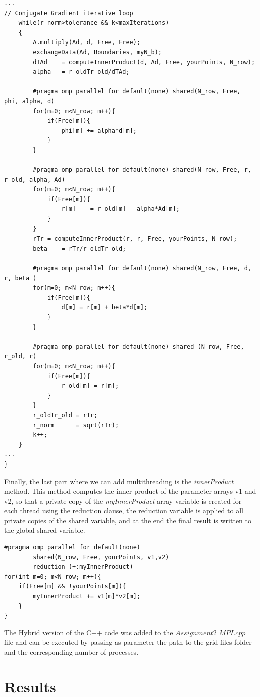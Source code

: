 \documentclass[12pt]{article}
\begin{document}
\begin{lstlisting}[style=MyC++Style]
...
// Conjugate Gradient iterative loop
    while(r_norm>tolerance && k<maxIterations)
    {
    	A.multiply(Ad, d, Free, Free);
		exchangeData(Ad, Boundaries, myN_b);
		dTAd	= computeInnerProduct(d, Ad, Free, yourPoints, N_row);
		alpha  	= r_oldTr_old/dTAd;
        
		#pragma omp parallel for default(none) shared(N_row, Free, phi, alpha, d)
		for(m=0; m<N_row; m++){
			if(Free[m]){
				phi[m] += alpha*d[m];
			}
		}
        
		#pragma omp parallel for default(none) shared(N_row, Free, r, r_old, alpha, Ad)
		for(m=0; m<N_row; m++){
			if(Free[m]){
				r[m]	= r_old[m] - alpha*Ad[m];
			}
		}
		rTr	= computeInnerProduct(r, r, Free, yourPoints, N_row);
		beta  	= rTr/r_oldTr_old;
        
		#pragma omp parallel for default(none) shared(N_row, Free, d, r, beta )
		for(m=0; m<N_row; m++){
			if(Free[m]){
				d[m] = r[m] + beta*d[m];
			}
		}
        
		#pragma omp parallel for default(none) shared (N_row, Free, r_old, r)
		for(m=0; m<N_row; m++){
			if(Free[m]){
				r_old[m] = r[m];
			}
		}
		r_oldTr_old	= rTr;
		r_norm		= sqrt(rTr);
		k++;
	}
...
}
\end{lstlisting}

Finally, the last part where we can add multithreading is the \textit{innerProduct} method. This method computes the inner product of the parameter arrays v1 and v2, so that a private copy of the \textit{myInnerProduct} array variable is created for each thread using the reduction clause, the reduction variable is applied to all private copies of the shared variable, and at the end the final result is written to the global shared variable.

\begin{lstlisting}[style=MyC++Style]
#pragma omp parallel for default(none) 
		shared(N_row, Free, yourPoints, v1,v2) 
		reduction (+:myInnerProduct)
for(int m=0; m<N_row; m++){
	if(Free[m] && !yourPoints[m]){
		myInnerProduct += v1[m]*v2[m];
	}
}
\end{lstlisting}

The Hybrid version of the C++ code was added to the $\textit{Assignment2\_MPI.cpp}$ file and can be executed by passing as parameter the path to the grid files folder and the corresponding number of processes. 
	
	\section{Results}
\end{document}
